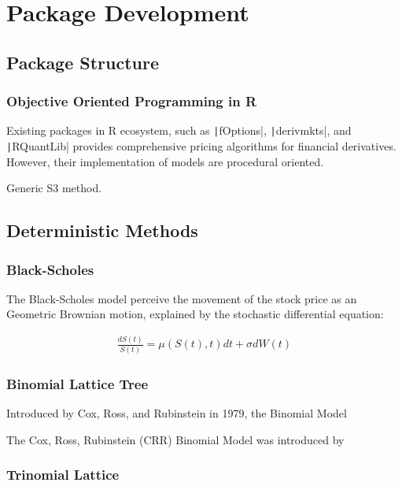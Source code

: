 \chapter{Package Development}

\section{Package Structure}

\subsection{Objective Oriented Programming in R}

Existing packages in R ecosystem, such as \texttt|fOptions|, \texttt|derivmkts|, and \texttt|RQuantLib| provides comprehensive pricing algorithms for financial derivatives. However, their implementation of models are procedural oriented.



Generic S3 method.


\section{Deterministic Methods}

\subsection{Black-Scholes}
The Black-Scholes model perceive the movement of the stock price as an Geometric Brownian motion, explained by the stochastic differential equation:

\begin{align*}
    \frac{dS(t)}{S(t)} = \mu (S(t), t)dt + \sigma dW(t)
\end{align*}


\subsection{Binomial Lattice Tree}


Introduced by Cox, Ross, and Rubinstein in 1979, the Binomial Model 

The Cox, Ross, Rubinstein (CRR) Binomial Model was introduced by 


\subsection{Trinomial Lattice}
 
